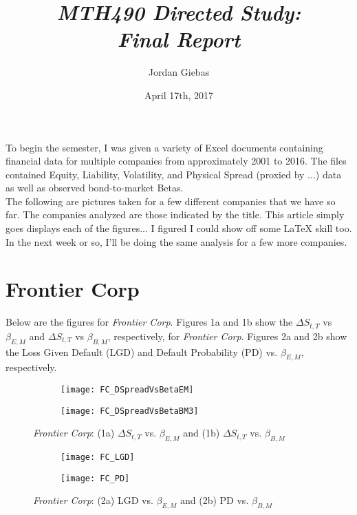 \documentclass[12pt, two-sided]{article}
\title{\emph{MTH490 Directed Study: \\
					Final Report}}
\author{Jordan Giebas}
\date{April 17th, 2017}
\begin{document}
 
\maketitle

To begin the semester, I was given a variety of Excel documents containing financial data for multiple companies from approximately 2001 to 2016. The files contained Equity, Liability, Volatility, and Physical Spread (proxied by ...) data as well as observed bond-to-market Betas. \\

The following are pictures taken for a few different companies that we have so far. The companies analyzed are those indicated by the title. This article  simply goes displays each of the figures... I figured I could show off some LaTeX skill too. In the next week or so, I'll be doing the same analysis for a few more companies.



\section{Frontier Corp}

Below are the figures for \emph{Frontier Corp}. Figures 1a and 1b show the $\Delta S_{t,T}$ vs $\beta_{E,M}$ and $\Delta S_{t,T}$ vs $\beta_{B,M}$, respectively, for \emph{Frontier Corp}. Figures 2a and 2b show the Loss Given Default (LGD) and Default Probability (PD) vs. $\beta_{E,M}$, respectively. 

\begin{figure}[H]
\begin{subfigure}{0.5\textwidth}
  \centering
  \texttt{[image: FC\_DSpreadVsBetaEM]}
  \caption{}
\end{subfigure}%
\begin{subfigure}{.5\textwidth}
  \centering
  \texttt{[image: FC\_DSpreadVsBetaBM3]}
  \caption{}
\end{subfigure}
\caption{\emph{Frontier Corp}: (1a)  $\Delta S_{t,T}$ vs. $\beta_{E,M}$
			  and (1b)  $\Delta S_{t,T}$ vs. $\beta_{B,M}$}
\end{figure}

\begin{figure}[H]
\begin{subfigure}{0.5\textwidth}
  \centering
  \texttt{[image: FC\_LGD]}
  \caption{}
  \end{subfigure}%
\begin{subfigure}{.5\textwidth}
  \centering
  \texttt{[image: FC\_PD]}
  \caption{}
\end{subfigure}
\caption{\emph{Frontier Corp}: (2a)  LGD vs. $\beta_{E,M}$
			  and (2b) PD vs. $\beta_{B,M}$}
\end{figure}
\end{document}
